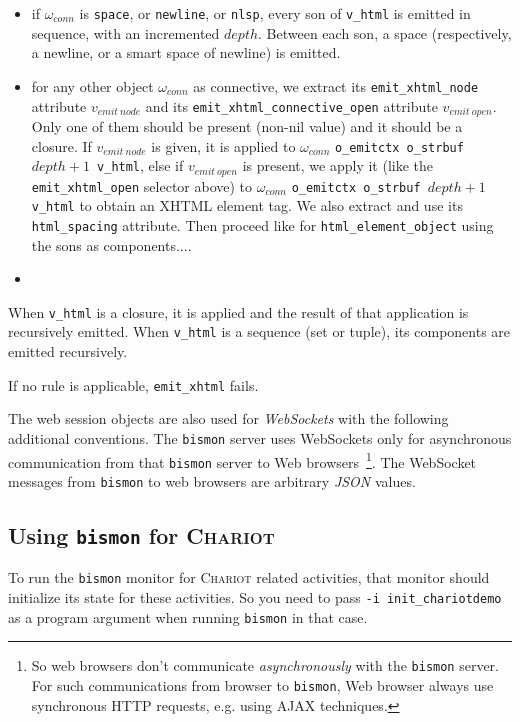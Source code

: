 \begin{itemize}
\item if $\omega_{conn}$ is \texttt{space}, or \texttt{newline}, or
  \texttt{nlsp}, every son of \texttt{v\_html} is emitted in sequence,
  with an incremented $depth$. Between each son, a space
  (respectively, a newline, or a smart space of newline) is emitted.
   


\item for any other object $\omega_{conn}$ as connective, we extract
  its \texttt{emit\_xhtml\_node} attribute $v_{emit~node}$ and its
  \texttt{emit\_xhtml\_connective\_open} attribute
  $v_{emit~open}$. Only one of them should be present (non-nil value)
  and it should be a closure. If $v_{emit~node}$ is given, it is
  applied to $\omega_{conn}$ \texttt{o\_emitctx o\_strbuf $depth + 1$
    v\_html}, else if $v_{emit~open}$ is present, we apply it (like
  the \texttt{emit\_xhtml\_open} selector above) to $\omega_{conn}$
  \texttt{o\_emitctx o\_strbuf $depth + 1$ v\_html} to obtain an XHTML
  element tag. We also extract and use its \texttt{html\_spacing}
  attribute. Then proceed like for \texttt{html\_element\_object}
  using the sons as components....
  
\item {\color{red}{@@ to be completed a lot.}}
  
\end{itemize}


When \texttt{v\_html} is a closure, it is applied {\color{red}{@@ to
    be completed}} and the result of that application is recursively
emitted. When \texttt{v\_html} is a sequence (set or tuple), its
components are emitted recursively.

If no rule is applicable, \texttt{emit\_xhtml} fails.

\medskip

The web session objects are also used for 
\emph{WebSockets} with the following additional conventions. The
\texttt{bismon} server uses WebSockets only for asynchronous
communication from that \texttt{bismon} server to Web
browsers~\footnote{So web browsers don't communicate
  \emph{asynchronously} with the \texttt{bismon} server. For such
  communications from browser to \texttt{bismon}, Web browser always
  use synchronous HTTP requests, e.g. using AJAX techniques.}. The
WebSocket messages from \texttt{bismon} to web browsers are arbitrary
\emph{JSON} values.

\subsection{Using \texttt{bismon} for \textsc{Chariot}}
\label{subsec:bismon-for-chariot}

To run the \texttt{bismon} monitor for \textsc{Chariot} related
activities, that monitor should initialize its state for these
activities. So you need to pass \texttt{-i init\_chariotdemo} as a
program argument when running \texttt{bismon} in that case.

